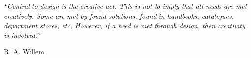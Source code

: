 

\epigraph{\textit{``Central to design is the creative act. This is not to imply that all needs are met creatively. Some are met by found solutions, found in handbooks, catalogues, department stores, etc. However, if a need is met through design, then creativity is involved.''}}{\textmd{R. A. Willem} \cite{Willem1990a}}













